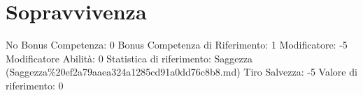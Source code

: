 \section{Sopravvivenza}\label{sopravvivenza}

\begin{description}
\tightlist
\item[Tags: ABI]
No Bonus Competenza: 0 Bonus Competenza di Riferimento: 1 Modificatore:
-5 Modificatore Abilità: 0 Statistica di riferimento: Saggezza
(Saggezza\%20ef2a79aaea324a1285cd91a0dd76c8b8.md) Tiro Salvezza: -5
Valore di riferimento: 0
\end{description}

